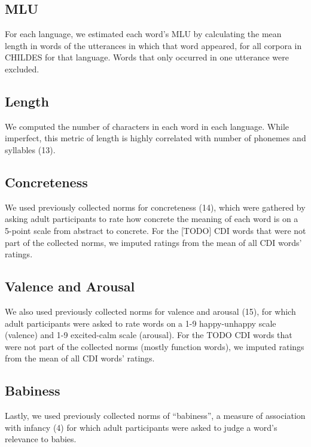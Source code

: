 \documentclass[9pt,twocolumn,twoside]{pnas-new}
\begin{document}
\subsection{MLU}\label{mlu}

For each language, we estimated each word's MLU by calculating the mean
length in words of the utterances in which that word appeared, for all
corpora in CHILDES for that language. Words that only occurred in one
utterance were excluded.

\subsection{Length}\label{length}

We computed the number of characters in each word in each language.
While imperfect, this metric of length is highly correlated with number
of phonemes and syllables (13).

\subsection{Concreteness}\label{concreteness}

We used previously collected norms for concreteness (14), which were
gathered by asking adult participants to rate how concrete the meaning
of each word is on a 5-point scale from abstract to concrete. For the
{[}TODO{]} CDI words that were not part of the collected norms, we
imputed ratings from the mean of all CDI words' ratings.

\subsection{Valence and Arousal}\label{valence-and-arousal}

We also used previously collected norms for valence and arousal (15),
for which adult participants were asked to rate words on a 1-9
happy-unhappy scale (valence) and 1-9 excited-calm scale (arousal). For
the TODO CDI words that were not part of the collected norms (mostly
function words), we imputed ratings from the mean of all CDI words'
ratings.

\subsection{Babiness}\label{babiness}

Lastly, we used previously collected norms of ``babiness'', a measure of
association with infancy (4) for which adult participants were asked to
judge a word's relevance to babies.
\end{document}
